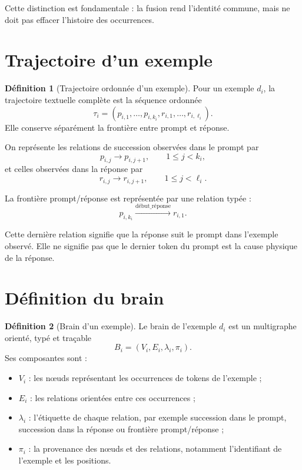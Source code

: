 \documentclass[11pt,a4paper]{report}
\theoremstyle{definition}
\newtheorem{definition}{Définition}[chapter]
\theoremstyle{plain}
\theoremstyle{remark}
\begin{document}
Cette distinction est fondamentale :
la fusion rend l'identité commune, mais ne doit pas effacer
l'histoire des occurrences.

\section{Trajectoire d'un exemple}

\begin{definition}[Trajectoire ordonnée d'un exemple]
Pour un exemple \(d_i\), la trajectoire textuelle complète est
la séquence ordonnée
\[
\tau_i=
(p_{i,1},\ldots,p_{i,k_i},
r_{i,1},\ldots,r_{i,\ell_i}).
\]
Elle conserve séparément la frontière entre prompt et réponse.
\end{definition}

On représente les relations de succession observées dans le
prompt par
\[
p_{i,j}\longrightarrow p_{i,j+1},
\qquad 1\leq j<k_i,
\]
et celles observées dans la réponse par
\[
r_{i,j}\longrightarrow r_{i,j+1},
\qquad 1\leq j<\ell_i.
\]

La frontière prompt/réponse est représentée par une relation
typée :
\[
p_{i,k_i}
\overset{\mathrm{début\_réponse}}{\longrightarrow}
r_{i,1}.
\]

Cette dernière relation signifie que la réponse suit le prompt
dans l'exemple observé. Elle ne signifie pas que le dernier token
du prompt est la cause physique de la réponse.

\section{Définition du brain}

\begin{definition}[Brain d'un exemple]
Le brain de l'exemple \(d_i\) est un multigraphe orienté, typé et
traçable
\[
B_i=(V_i,E_i,\lambda_i,\pi_i).
\]
Ses composantes sont :

\begin{itemize}
  \item \(V_i\) : les nœuds représentant les occurrences de tokens
        de l'exemple ;
  \item \(E_i\) : les relations orientées entre ces occurrences ;
  \item \(\lambda_i\) : l'étiquette de chaque relation, par
        exemple succession dans le prompt, succession dans la
        réponse ou frontière prompt/réponse ;
  \item \(\pi_i\) : la provenance des nœuds et des relations,
        notamment l'identifiant de l'exemple et les positions.
\end{itemize}
\end{definition}
\end{document}
